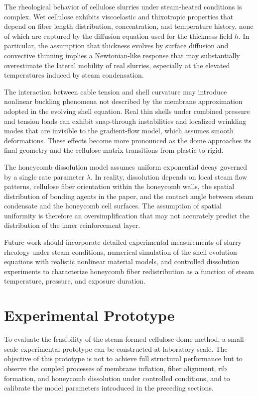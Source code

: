 \documentclass[12pt,a4paper]{article}
\begin{document}
The rheological behavior of cellulose slurries under steam-heated
conditions is complex. Wet cellulose exhibits viscoelastic and
thixotropic properties that depend on fiber length distribution,
concentration, and temperature history, none of which are captured
by the diffusion equation used for the thickness field $h$. In
particular, the assumption that thickness evolves by surface diffusion
and convective thinning implies a Newtonian-like response that may
substantially overestimate the lateral mobility of real slurries,
especially at the elevated temperatures induced by steam condensation.

The interaction between cable tension and shell curvature may introduce
nonlinear buckling phenomena not described by the membrane approximation
adopted in the evolving shell equation. Real thin shells under combined
pressure and tension loads can exhibit snap-through instabilities and
localized wrinkling modes that are invisible to the gradient-flow
model, which assumes smooth deformations. These effects become more
pronounced as the dome approaches its final geometry and the cellulose
matrix transitions from plastic to rigid.

The honeycomb dissolution model assumes uniform exponential decay
governed by a single rate parameter $\lambda$. In reality, dissolution
depends on local steam flow patterns, cellulose fiber orientation
within the honeycomb walls, the spatial distribution of bonding agents
in the paper, and the contact angle between steam condensate and the
honeycomb cell surfaces. The assumption of spatial uniformity is
therefore an oversimplification that may not accurately predict the
distribution of the inner reinforcement layer.

Future work should incorporate detailed experimental measurements of
slurry rheology under steam conditions, numerical simulation of the
shell evolution equations with realistic nonlinear material models, and
controlled dissolution experiments to characterize honeycomb fiber
redistribution as a function of steam temperature, pressure, and
exposure duration.

\section{Experimental Prototype}

To evaluate the feasibility of the steam-formed cellulose dome method,
a small-scale experimental prototype can be constructed at laboratory
scale. The objective of this prototype is not to achieve full structural
performance but to observe the coupled processes of membrane inflation,
fiber alignment, rib formation, and honeycomb dissolution under
controlled conditions, and to calibrate the model parameters introduced
in the preceding sections.
\end{document}
